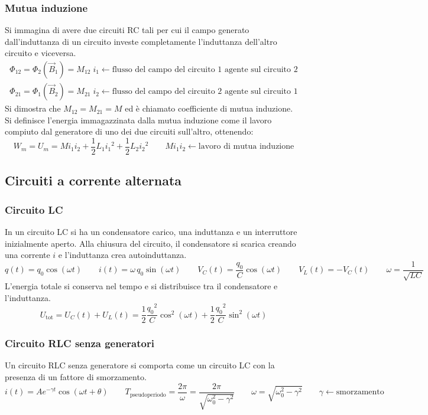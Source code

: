 \documentclass[a4paper]{article}
\begin{document}
\subsubsection*{Mutua induzione}
Si immagina di avere due circuiti RC tali per cui il campo generato dall'induttanza di un circuito investe completamente
l'induttanza dell'altro circuito e viceversa.
\[\begin{matrix}
	\Phi_{12} = \Phi_2(\vec{B}_1) = M_{12} \; i_1 \leftarrow \text{flusso del campo del circuito 1 agente sul circuito 2} \\
	\Phi_{21} = \Phi_1(\vec{B}_2) = M_{21} \; i_2 \leftarrow \text{flusso del campo del circuito 2 agente sul circuito 1}
\end{matrix}\]
Si dimostra che \(M_{12} = M_{21} = M\) ed è chiamato coefficiente di mutua induzione.\\
Si definisce l'energia immagazzinata dalla mutua induzione come il lavoro compiuto dal generatore di uno dei due circuiti
sull'altro, ottenendo:
\[W_m = U_m = M i_1 i_2 + \frac{1}{2} L_1 {i_1}^2 + \frac{1}{2} L_2 {i_2}^2 \qquad M i_1 i_2 \leftarrow \text{lavoro di mutua induzione} \]

\subsection{Circuiti a corrente alternata}
\subsubsection*{Circuito LC}
In un circuito LC si ha un condensatore carico, una induttanza e un interruttore inizialmente aperto. Alla chiusura del circuito,
il condensatore si scarica creando una corrente \(i\) e l'induttanza crea autoinduttanza.
\[q(t) = q_0 \cos (\omega t) \qquad i(t) = \omega \, q_0 \sin(\omega t) \qquad V_C(t) = \frac{q_0}{C} \cos(\omega t) \qquad V_L(t) =  -V_C(t) \qquad \omega = \frac{1}{\sqrt{LC}}\]
L'energia totale si conserva nel tempo e si distribuisce tra il condensatore e l'induttanza.
\[U_\text{tot} = U_C(t) + U_L(t) = \frac{1}{2} \frac{{q_0}^2}{C} \cos^2(\omega t) + \frac{1}{2} \frac{{q_0}^2}{C} \sin^2(\omega t)\]

\subsubsection*{Circuito RLC senza generatori}
Un circuito RLC senza generatore si comporta come un circuito LC con la presenza di un fattore di smorzamento.
\[i(t) = A e^{-\gamma t} \cos(\omega t + \theta) \qquad T_\text{pseudoperiodo} = \frac{2\pi}{\omega} = \frac{2\pi}{\sqrt{\omega_0^2 - \gamma^2}} \qquad \omega = \sqrt{\omega_0^2 - \gamma^2} \qquad \gamma \leftarrow \text{smorzamento}\]
\end{document}
